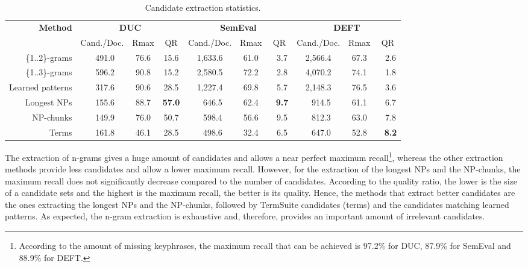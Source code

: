     \begin{table*}
      \centering
      \begin{tabular}{@{~}r@{~~}c@{~~}c@{~~}c@{~~}c@{~~}c@{~~}c@{~~}c@{~~}c@{~~}c@{~}}
        \toprule
        \multirow{2}{*}[-2pt]{\textbf{Method}} & \multicolumn{3}{c}{\textbf{DUC}} & \multicolumn{3}{c}{\textbf{SemEval}} & \multicolumn{3}{c}{\textbf{DEFT}}\\
        \cmidrule(r){2-4}\cmidrule(r){5-7}\cmidrule{8-10}
        & Cand./Doc. & Rmax & QR & Cand./Doc. & Rmax & QR & Cand./Doc. & Rmax &
        QR\\
        \midrule
        \{1..2\}-grams & $~~~$491.0 & 76.6 & 15.6 & 1,633.6 & 61.0 & $~~~$3.7 & 2,566.4 & 67.3 & $~~~$2.6\\
        \{1..3\}-grams & $~~~$596.2 & 90.8 & 15.2 & 2,580.5 & 72.2 & $~~~$2.8 & 4,070.2 & 74.1 & $~~~$1.8\\
        Learned patterns & $~~~$317.6 & 90.6 & 28.5 & 1,227.4 & 69.8 & $~~~$5.7 & 2,148.3 & 76.5 & $~~~$3.6\\
        Longest NPs & $~~~$155.6 & 88.7 & \textbf{57.0} & $~~~$646.5 & 62.4 & \textbf{$~~~$9.7} & $~~~$914.5 & 61.1 & $~~~$6.7\\
        NP-chunks & $~~~$149.9 & 76.0 & 50.7 & $~~~$598.4 & 56.6 & $~~~$9.5 & $~~~$812.3 & 63.0 & $~~~$7.8\\
        Terms & $~~~$161.8 & 46.1 & 28.5 & $~~~$498.6 & 32.4 & $~~~$6.5 & $~~~$647.0 & 52.8 & \textbf{$~~~$8.2}\\
        \bottomrule
      \end{tabular}
      \caption{Candidate extraction statistics.
               \label{tab:candidate_extraction_statistics}}
    \end{table*}

      The extraction  of n-grams gives a huge amount of candidates and allows a
      near perfect maximum recall\footnote{According to the amount of missing
      keyphrases, the maximum recall that can be achieved is 97.2\% for DUC,
      87.9\% for SemEval and 88.9\% for DEFT.}, whereas the other extraction
      methods provide less candidates and allow a lower maximum recall.
      However, for the extraction of the longest NPs and the NP-chunks, the
      maximum recall does not significantly decrease compared to the number of
      candidates. According to the quality ratio, the lower is the size of a
      candidate sets and the highest is the maximum recall, the better is its
      quality. Hence, the methods that extract better
      candidates are the ones extracting the longest NPs and the NP-chunks,
      followed by TermSuite candidates (terms) and the candidates matching
      learned patterns. As expected, the n-gram extraction is exhaustive and,
      therefore, provides an important amount of irrelevant candidates.
      
